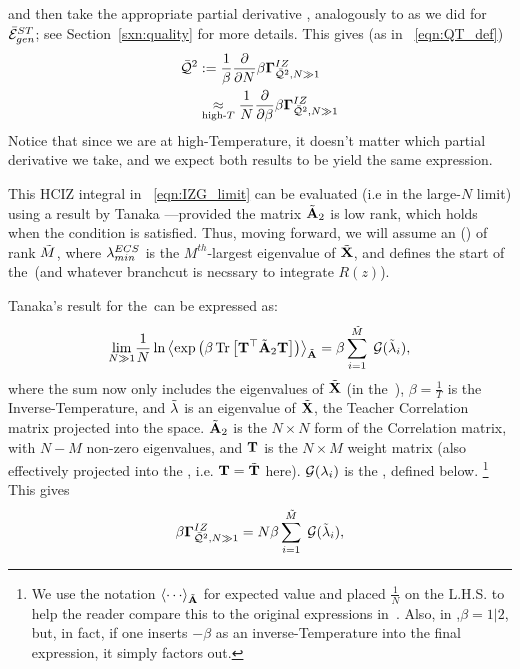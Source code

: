 and then take the appropriate partial derivative ,
analogously to as we did for $\bar{\mathcal{E}}^{ST}_{gen}$; see Section~\ref{sxn:quality} for more details.
This gives (as in \EQN~\ref{eqn:QT_def})
\begin{align}
\label{eqn:IZG_generate_Q2}
\QT &:= \frac{1}{\beta}\frac{\partial }{\partial N}\IZGINF  \\ 
&\underset{\text{high-}T}{\approx}
\frac{1}{N}\frac{\partial }{\partial \beta}\IZGINF 
\end{align}
Notice that since we are at high-Temperature, it doesn't matter which partial derivative we take,
and we expect both results to be yield the same expression.

This HCIZ integral in \EQN~\ref{eqn:IZG_limit} can be evaluated
(i.e in the large-$N$ limit) using a result by Tanaka ---provided
the matrix $\tilde{\mathbf{A}}_{2}$ is low rank, which holds when the \TRACELOG condition is satisfied.
Thus, moving forward, we will assume an
\EffectiveCorrelationSpace (\ECS) of rank $\tilde{M}$, where $\lambda^{ECS}_{min}$ is the $M^{th}$-largest eigenvalue of $\tilde{\mathbf{X}}$,
and defines the start of the~\ECS (and whatever branchcut is necssary to integrate $R(z)$).

Tanaka's result for the~\ECS can be expressed as:
\begin{equation}
  \label{eqn:tanaka_result}
  \underset{N\gg 1}{\lim}\frac{1}{N}\ln
\Expected[\AECS]{\exp\left(\beta \Trace{\TMAT^{\top}\AECS_{2}\TMAT}\right)}
  =\beta\sum\limits_{i=1}^{\MECS}\;\GNECSI,
\end{equation}
where the sum now only includes the eigenvalues of $\tilde{\mathbf{X}}$ (in the~\ECS), $\beta=\tfrac{1}{T}$
is the Inverse-Temperature, and $\tilde{\lambda}$ is an eigenvalue of $\tilde{\mathbf{X}}$, the Teacher
Correlation matrix projected into the \ECS space.
$\tilde{\mathbf{A}}_{2}$ is the $N \times N$ form of the \Student Correlation matrix,
with $N-M$ non-zero eigenvalues, and ${\mathbf{T}}$ is the $N\times M$ \Teacher  weight matrix
(also effectively projected into the \ECS, i.e. ${\mathbf{T}}=\tilde{\mathbf{T}}$ here).
$\mathcal{G}(\lambda_{i})$ is the \GEN, defined below.
\footnote{We use the notation $\Expected[\AECS]{\cdots}$ for expected value and placed $\tfrac{1}{N}$ on the L.H.S.
to help the reader compare this to the original expressions in~\cite{Tanaka2007, Tanaka2008}.
Also,  in \cite{Tanaka2007, Tanaka2008},$\beta=1|2$, but, in fact, if one inserts $-\beta$ as an inverse-Temperature into the final expression, it simply factors out.}
This gives
\begin{equation}
\label{eqn:tanaka_result2}
\IZGINF = N\beta\sum\limits_{i=1}^{\MECS}\;\GNECSI,
\end{equation}



